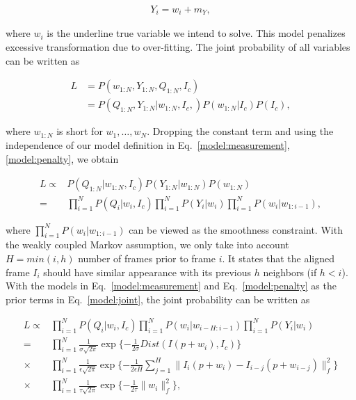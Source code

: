\documentclass[10pt,journal]{IEEEtran}
\begin{document}
\begin{align}
\label{model:penalty}
Y_i=w_i+m_Y,
\end{align}

\noindent where $w_i$ is the underline true variable we intend to solve. This model penalizes excessive transformation due to over-fitting. The joint probability of all variables can be written as

\begin{align}
L&=P(w_{1:N},Y_{1:N},Q_{1:N},I_c) \\
 &=P(Q_{1:N},Y_{1:N}|w_{1:N},I_c,)P(w_{1:N}|I_c)P(I_c),
\end{align}

\noindent where $w_{1:N}$ is short for $w_1,\ldots,w_N$. Dropping the constant term and using the independence of our model definition in Eq.~\eqref{model:measurement}, \ref{model:penalty}, we obtain

\begin{align}
L\propto & P(Q_{1:N}|w_{1:N},I_c) P(Y_{1:N}|w_{1:N}) P(w_{1:N}) \\
				=& \prod_{i=1}^N{P(Q_i|w_i,I_c)} \prod_{i=1}^N{P(Y_i|w_i)} \prod_{i=1}^N {P(w_i|w_{1:i-1})},
\label{model:joint}
\end{align}

\noindent where $\prod_{i=1}^N {P(w_i|w_{1:i-1})}$ can be viewed as the smoothness constraint. With the weakly coupled Markov assumption, we only take into account $H=min(i,h)$ number of frames prior to frame $i$. It states that the aligned frame $I_i$ should have similar appearance with its previous $h$ neighbors (if $h<i$). With the models in Eq.~\eqref{model:measurement} and Eq.~\eqref{model:penalty} as the prior terms in Eq.~\eqref{model:joint}, the joint probability can be written as 

\begin{align}
L\propto & \prod_{i=1}^N{P(Q_i|w_i,I_c)} \prod_{i=1}^N {P(w_i|w_{i-H:i-1})} \prod_{i=1}^N{P(Y_i|w_i)} \\
\label{data_exp}
				=& \prod_{i=1}^N \frac{1}{\sigma \sqrt{2\pi}} \exp\{-\frac{1}{2\sigma}Dist(I(p+w_i),I_c)\}  \\
\label{smooth_exp}
				\times &\prod_{i=1}^N \frac{1}{\epsilon \sqrt{2\pi}} \exp\{-\frac{1}{2\epsilon H}\sum_{j=1}^{H}\parallel{I_i(p+w_i)-I_{i-j}(p+w_{i-j})}\parallel_f^2\} \\
\label{penalty_exp}
				\times &\prod_{i=1}^N \frac{1}{\tau \sqrt{2\pi}} \exp\{-\frac{1}{2\tau}\parallel{w_i}\parallel_f^2\},
\end{align}
\end{document}
